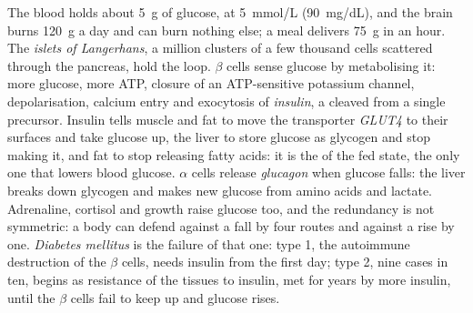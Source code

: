 \begin{definition}\label{def:b3:endocrinology:glucose}
The blood holds about \qty{5}{g} of glucose, at \qty{5}{mmol/L}
(\qty{90}{mg/dL}), and the brain burns \qty{120}{g} a day and can burn
nothing else; a meal delivers \qty{75}{g} in an hour. The
\emph{islets of Langerhans}, a million clusters of a few thousand cells
scattered through the pancreas, hold the loop. $\beta$ cells sense
glucose by metabolising it: more glucose, more ATP, closure of an
ATP-sensitive potassium channel, depolarisation, calcium entry and
exocytosis of \emph{insulin}, a  cleaved from a single
precursor. Insulin tells muscle and fat to move the transporter
\emph{GLUT4} to their surfaces and take glucose up, the liver to store
glucose as glycogen and stop making it, and fat to stop releasing fatty
acids: it is the  of the fed state, the only one that lowers
blood glucose. $\alpha$ cells release \emph{glucagon} when glucose
falls: the liver breaks down glycogen and makes new glucose from amino
acids and lactate. Adrenaline, cortisol and growth  raise
glucose too, and the redundancy is not symmetric: a body can defend
against a fall by four routes and against a rise by one. \emph{Diabetes
mellitus} is the failure of that one: type 1, the autoimmune
destruction of the $\beta$ cells, needs insulin from the first day;
type 2, nine cases in ten, begins as resistance of the tissues to
insulin, met for years by more insulin, until the $\beta$ cells fail to
keep up and glucose rises.
\end{definition}

